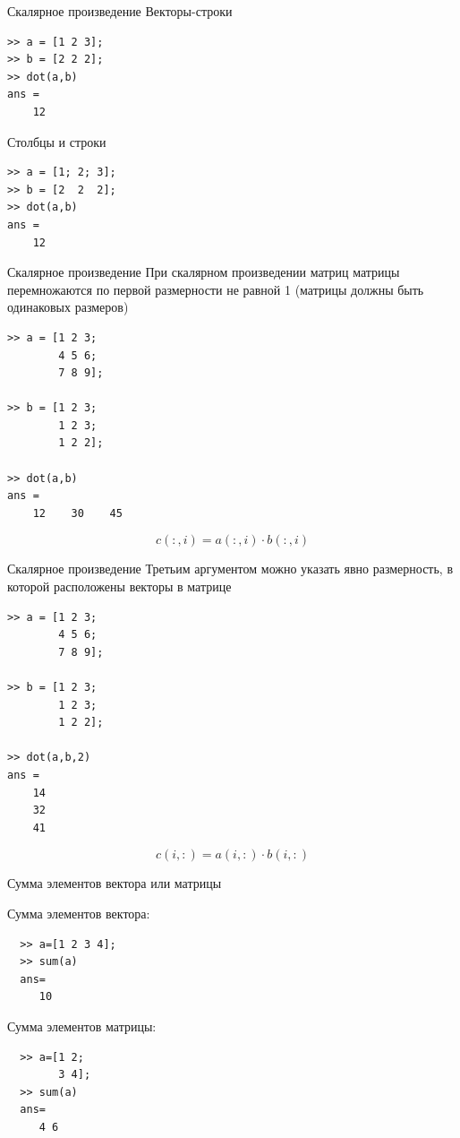 \documentclass[11pt, compress]{beamer}
\begin{document}
\begin{frame}[fragile]{Скалярное произведение}
Векторы-строки  
\begin{lstlisting}
>> a = [1 2 3];
>> b = [2 2 2];     
>> dot(a,b)
ans =
    12
\end{lstlisting}
Столбцы и строки
\begin{lstlisting}
>> a = [1; 2; 3];
>> b = [2  2  2];     
>> dot(a,b)
ans =
    12
\end{lstlisting}
\end{frame}

\begin{frame}[fragile]{Скалярное произведение}
При скалярном произведении матриц матрицы перемножаются по первой размерности не равной 1 (матрицы должны быть одинаковых размеров)
\begin{lstlisting}
>> a = [1 2 3;
        4 5 6; 
        7 8 9];

>> b = [1 2 3; 
        1 2 3; 
        1 2 2];     

>> dot(a,b)
ans =
    12    30    45
\end{lstlisting}

$$
  c(:,i) = a(:,i) \cdot b(:,i)
$$
\end{frame}

\begin{frame}[fragile]{Скалярное произведение}
Третьим аргументом можно указать явно размерность, в которой расположены векторы в матрице
\begin{lstlisting}
>> a = [1 2 3;
        4 5 6; 
        7 8 9];

>> b = [1 2 3; 
        1 2 3; 
        1 2 2];     

>> dot(a,b,2)
ans =
    14
    32
    41
\end{lstlisting}
$$
  c(i,:) = a(i,:) \cdot b(i,:)
$$
\end{frame}

\begin{frame}[fragile]{Сумма элементов вектора или матрицы}

  Сумма элементов вектора:
  \begin{lstlisting}
  >> a=[1 2 3 4];
  >> sum(a)
  ans=
     10     
  \end{lstlisting} 
  Сумма элементов матрицы:
  \begin{lstlisting}
  >> a=[1 2;
        3 4];
  >> sum(a)
  ans=
     4 6     
  \end{lstlisting} 
\end{frame}
\end{document}
